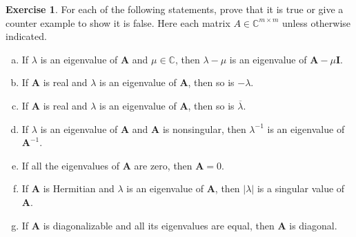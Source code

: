 \documentclass[12pt]{article}
\newcommand{\bbC}{\mathbb{C}}
\newcommand{\abs}[1]{ \left| #1 \right| }
\renewcommand{\vec}[1]{\mathbf{#1}}
\theoremstyle{definition}
\newtheorem{exer}{Exercise}
\theoremstyle{remark}
\begin{document}
\newpage

\begin{exer}
    For each of the following statements, prove that it is true or give a counter example to show it is false. Here each matrix $A\in \bbC^{m\times m}$ unless otherwise indicated.

    \begin{enumerate}[(a)]
        \item If $\lambda$ is an eigenvalue of $\vec{A}$ and $\mu\in\bbC$, then  $\lambda-\mu$ is an eigenvalue of $ \vec{A}- \mu \vec{I}$.
        \item If $\vec{A}$ is real and $\lambda$ is an eigenvalue of  $\vec{A}$, then so is $-\lambda$.
        \item If $\vec{A}$ is real and $\lambda$ is an eigenvalue of $\vec{A}$, then so is $\overline{\lambda}$.
        \item If $\lambda$ is an eigenvalue of $\vec{A}$ and $\vec{A}$ is nonsingular, then $\lambda^{-1}$ is an eigenvalue of $\vec{A}^{-1}$.
        \item If all the eigenvalues of $\vec{A}$ are zero, then $\vec{A}=0$.
        \item If $\vec{A}$ is Hermitian and $\lambda$ is an eigenvalue of  $\vec{A}$, then $\abs{\lambda}$ is a singular value of $\vec{A}$.
        \item If $\vec{A}$ is diagonalizable and all its eigenvalues are equal, then $\vec{A}$ is diagonal.
\end{enumerate}
\end{exer}
\end{document}
